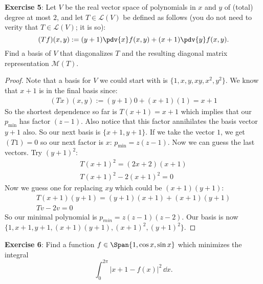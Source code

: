 \documentclass{article}
\begin{document}
\textbf{Exercise 5}: Let $V$ be the real vector space of polynomials in $x$ and $y$ of (total) degree at most $2$, and let $T \in \mathcal{L}(V)$ be defined as follows (you do not need to verity that $T \in \mathcal{L}(V)$; it is so):
\begin{equation*}
	(Tf)(x,y) := (y + 1)\pdv{x}f(x, y) + (x + 1)\pdv{y}f(x, y).
\end{equation*}
Find a basis of $V$ that diagonalizes $T$ and the resulting diagonal matrix representation $\mathcal{M}(T)$.
\begin{proof}
	Note that a basis for $V$ we could start with is $\{1, x, y, xy, x^{2}, y^{2}\}$. We know that $x + 1$ is in the final basis since:
	\begin{align*}
		(Tx)(x,y) := (y + 1)0 + (x + 1)(1) = x + 1
	\end{align*}
	So the shortest dependence so far is $T(x + 1) = x + 1$ which implies that our $p_{\text{min}}$ has factor $(z - 1)$. Also notice that this factor annihilates the basis vector $y + 1$ also. So our next basis is $\{x + 1, y + 1\}$. If we take the vector $1$, we get $(T1) = 0$ so our next factor is $x$: $p_{\text{min}} = z(z - 1)$. Now we can guess the last vectors. Try $(y + 1)^{2}$:
	\begin{align*}
		T(x + 1)^{2} = (2x + 2)(x + 1) \\
		T(x + 1)^{2} - 2(x + 1)^{2} = 0 
	\end{align*}
	Now we guess one for replacing $xy$ which could be $(x + 1)(y + 1)$:
	\begin{gather*}
		T(x + 1)(y + 1) = (y + 1)(x + 1) + (x + 1)(y + 1) \\
		Tv - 2v = 0
	\end{gather*}
	So our minimal polynomial is $p_{min} = z(z - 1)(z - 2)$. Our basis is now $\{1, x + 1, y + 1, (x + 1)(y + 1), (x + 1)^{2}, (y + 1)^{2}\}$.
\end{proof}
\textbf{Exercise 6}: Find a function $f \in  \Span\{1, \cos{x}, \sin{x}\}$ which minimizes the integral
\begin{equation*}
	\int_{0}^{2\pi} \lvert x + 1 - f(x) \rvert^{2} \,\dd{x}.
\end{equation*}
\end{document}
